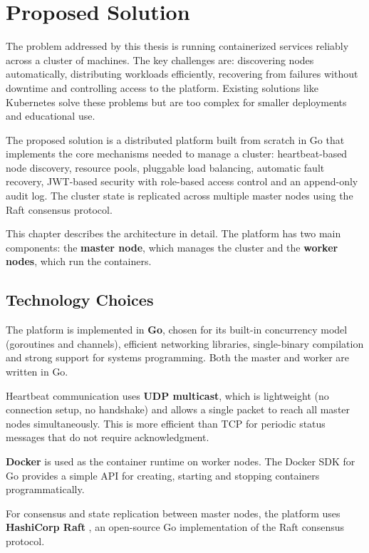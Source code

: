 \chapter{Proposed Solution}
\label{cap:cap3}

The problem addressed by this thesis is running containerized services reliably across a cluster of machines. The key challenges are: discovering nodes automatically, distributing workloads efficiently, recovering from failures without downtime and controlling access to the platform. Existing solutions like Kubernetes solve these problems but are too complex for smaller deployments and educational use.

The proposed solution is a distributed platform built from scratch in Go that implements the core mechanisms needed to manage a cluster: heartbeat-based node discovery, resource pools, pluggable load balancing, automatic fault recovery, JWT-based security with role-based access control and an append-only audit log. The cluster state is replicated across multiple master nodes using the Raft consensus protocol.

This chapter describes the architecture in detail. The platform has two main components: the \textbf{master node}, which manages the cluster and the \textbf{worker nodes}, which run the containers.

\section{Technology Choices}

The platform is implemented in \textbf{Go}, chosen for its built-in concurrency model (goroutines and channels), efficient networking libraries, single-binary compilation and strong support for systems programming. Both the master and worker are written in Go.

Heartbeat communication uses \textbf{UDP multicast}, which is lightweight (no connection setup, no handshake) and allows a single packet to reach all master nodes simultaneously. This is more efficient than TCP for periodic status messages that do not require acknowledgment.

\textbf{Docker} is used as the container runtime on worker nodes. The Docker SDK for Go \cite{misc:web:docker:sdk} provides a simple API for creating, starting and stopping containers programmatically.

For consensus and state replication between master nodes, the platform uses \textbf{HashiCorp Raft} \cite{misc:web:hashicorp:raft}, an open-source Go implementation of the Raft consensus protocol.

